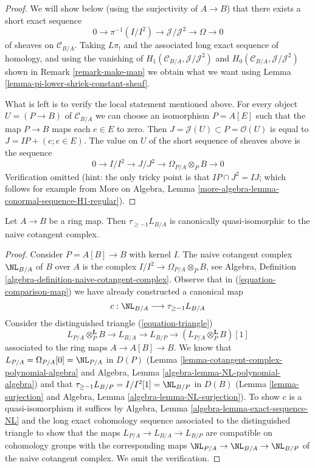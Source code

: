 \begin{proof}
We will show below (using the surjectivity of $A \to B$)
that there exists a short exact sequence
$$
0 \to \pi^{-1}(I/I^2) \to \mathcal{J}/\mathcal{J}^2 \to \Omega \to 0
$$
of sheaves on $\mathcal{C}_{B/A}$. Taking $L\pi_!$ and
the associated long exact sequence of homology, and using the
vanishing of $H_1(\mathcal{C}_{B/A}, \mathcal{J}/\mathcal{J}^2)$ and
$H_0(\mathcal{C}_{B/A}, \mathcal{J}/\mathcal{J}^2)$
shown in Remark \ref{remark-make-map} we obtain what we want using
Lemma \ref{lemma-pi-lower-shriek-constant-sheaf}.

\medskip\noindent
What is left is to verify the local statement mentioned above.
For every object $U = (P \to B)$ of $\mathcal{C}_{B/A}$
we can choose an isomorphism $P = A[E]$ such that the map
$P \to B$ maps each $e \in E$ to zero. Then
$J = \mathcal{J}(U) \subset P = \mathcal{O}(U)$
is equal to $J = IP + (e; e \in E)$. The value on $U$ of the short sequence
of sheaves above is the sequence
$$
0 \to I/I^2 \to J/J^2 \to \Omega_{P/A} \otimes_P B \to 0
$$
Verification omitted (hint: the only tricky point is that
$IP \cap J^2 = IJ$; which follows for example from
More on Algebra, Lemma \ref{more-algebra-lemma-conormal-sequence-H1-regular}).
\end{proof}

\begin{lemma}
\label{lemma-relation-with-naive-cotangent-complex}
Let $A \to B$ be a ring map. Then $\tau_{\geq -1}L_{B/A}$
is canonically quasi-isomorphic to the naive cotangent complex.
\end{lemma}

\begin{proof}
Consider $P = A[B] \to B$ with kernel $I$. The naive cotangent
complex $\NL_{B/A}$ of $B$ over $A$ is the complex
$I/I^2 \to \Omega_{P/A} \otimes_P B$,
see Algebra, Definition \ref{algebra-definition-naive-cotangent-complex}.
Observe that in (\ref{equation-comparison-map}) we have already
constructed a canonical map
$$
c : \NL_{B/A} \longrightarrow \tau_{\geq -1}L_{B/A}
$$
Consider the distinguished triangle (\ref{equation-triangle})
$$
L_{P/A} \otimes_P^\mathbf{L} B \to L_{B/A} \to L_{B/P} \to 
(L_{P/A} \otimes_P^\mathbf{L} B)[1]
$$
associated to the ring maps $A \to A[B] \to B$. We know that
$L_{P/A} = \Omega_{P/A}[0] = \NL_{P/A}$ in $D(P)$
(Lemma \ref{lemma-cotangent-complex-polynomial-algebra}
and
Algebra, Lemma \ref{algebra-lemma-NL-polynomial-algebra})
and that
$\tau_{\geq -1}L_{B/P} = I/I^2[1] = \NL_{B/P}$ in $D(B)$
(Lemma \ref{lemma-surjection} and
Algebra, Lemma \ref{algebra-lemma-NL-surjection}).
To show $c$ is a quasi-isomorphism it suffices by
Algebra, Lemma \ref{algebra-lemma-exact-sequence-NL}
and the long exact cohomology sequence associated to the
distinguished triangle
to show that the maps $L_{P/A} \to L_{B/A} \to L_{B/P}$ are compatible
on cohomology groups with the corresponding maps
$\NL_{P/A} \to \NL_{B/A} \to \NL_{B/P}$
of the naive cotangent complex. We omit the verification.
\end{proof}


